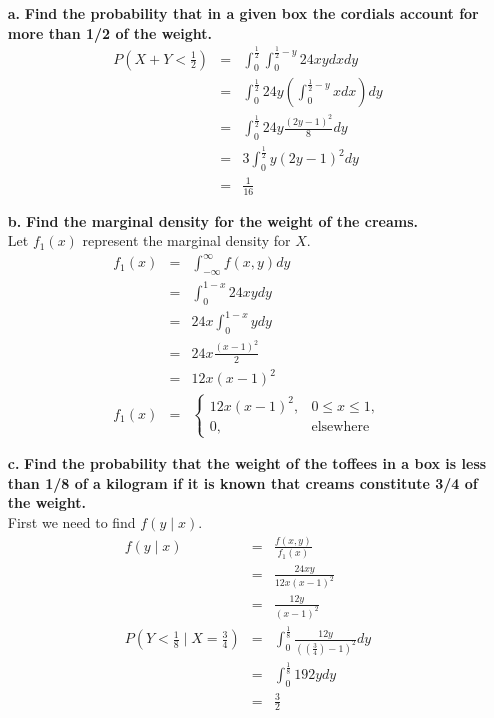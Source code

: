\documentclass{article}
\begin{document}
\begin{enumerate}
\item[\textbf{a.}] \textbf{Find the probability that in a given box 
the cordials account for more than 1/2 of the weight.}
\begin{eqnarray*}
P(X+Y<\frac{1}{2}) & = & \int_0^{\frac{1}{2}} \int_0^{\frac{1}{2}-y} 24xydxdy\\
	& = & \int_0^{\frac{1}{2}} 24y \left( \int_0^{\frac{1}{2}-y} xdx \right)dy\\
	& = & \int_0^{\frac{1}{2}} 24y\frac{(2y-1)^2}{8}dy\\
	& = & 3 \int_0^{\frac{1}{2}} y(2y-1)^2dy\\
	& = & \frac{1}{16}
\end{eqnarray*}

\item[\textbf{b.}] \textbf{Find the marginal density for the weight
of the creams.}\\
Let $f_1(x)$ represent the marginal density for $X$.
\begin{eqnarray*}
f_1(x) & = & \int_{-\infty}^\infty f(x,y)dy\\
	& = & \int_0^{1-x} 24xydy\\
	& = & 24x \int_0^{1-x} ydy\\
	& = & 24x \frac{(x-1)^2}{2}\\
	& = & 12x(x-1)^2\\
f_1(x) & = & \left\{ \begin{array}{ll}
	12x(x-1)^2, & 0 \leq x \leq 1,\\
	0, & \mbox{elsewhere}
	\end{array} \right.
\end{eqnarray*}

\pagebreak

\item[\textbf{c.}] \textbf{Find the probability that the weight of 
the toffees in a box is less than 1/8 of a kilogram if it 
is known that creams constitute 3/4 of the weight.}\\
First we need to find $f(y\mid x)$.
\begin{eqnarray*}
f(y\mid x) & = & \frac{f(x,y)}{f_1(x)}\\
	& = & \frac{24xy}{12x(x-1)^2}\\
	& = & \frac{12y}{(x-1)^2}\\
P(Y<\frac{1}{8}\mid X=\frac{3}{4}) & = & \int_0^{\frac{1}{8}} 
		\frac{12y}{((\frac{3}{4})-1)^2}dy\\
	& = & \int_0^\frac{1}{8} 192ydy\\
	& = & \frac{3}{2}
\end{eqnarray*}
\end{enumerate}
\end{document}
